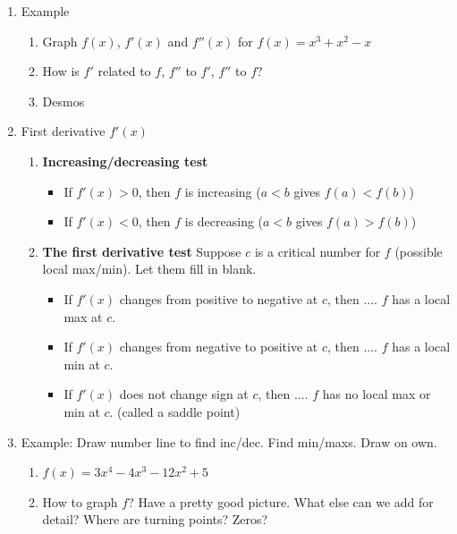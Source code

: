 \documentclass{article}
\begin{document}
\begin{enumerate}
\item Example
\begin{enumerate}
\item Graph $f(x)$, $f'(x)$ and $f''(x)$ for $f(x) = x^3+x^2-x$
\item How is $f'$ related to $f$, $f''$ to $f'$, $f''$ to $f$?
\item Desmos
\end{enumerate}

\item First derivative $f'(x)$
\begin{enumerate}
\item {\bf Increasing/decreasing test}
\begin{itemize}
\item If $f'(x) >0$, then $f$ is increasing ($a<b$ gives $f(a)<f(b)$)
\item If $f'(x)<0$, then $f$ is decreasing ($a<b$ gives $f(a)>f(b)$)
\end{itemize}
\item {\bf The first derivative test} Suppose $c$ is a critical number for $f$ (possible local max/min). Let them fill in blank.
\begin{itemize}
\item If $f'(x)$ changes from positive to negative at $c$, then .... $f$ has a local max at $c$.
\item If $f'(x)$ changes from negative to positive at $c$, then .... $f$ has a local min at $c$.
\item If $f'(x)$ does not change sign at $c$, then .... $f$ has no local max or min at $c$.  (called a saddle point)
\end{itemize}
\end{enumerate}

\item  Example: Draw number line to find inc/dec. Find min/maxs. Draw on own.
\begin{enumerate}
\item $f(x) =3x^4-4x^3-12x^2+5$ 
\item How to graph $f$? Have a pretty good picture. What else can we add for detail? Where are turning points? Zeros?
\end{enumerate}


\end{enumerate}
\end{document}
